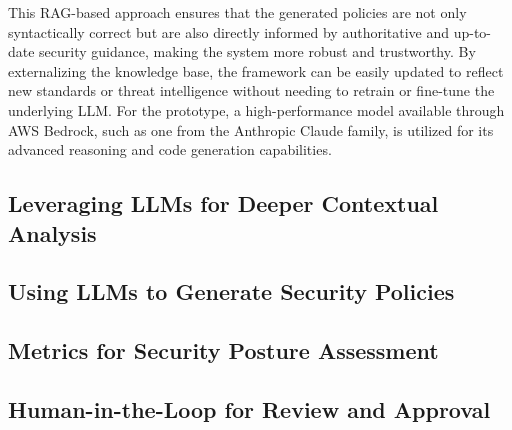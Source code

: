This RAG-based approach ensures that the generated policies are not only syntactically correct but are also directly informed by authoritative and up-to-date security guidance, making the system more robust and trustworthy. By externalizing the knowledge base, the framework can be easily updated to reflect new standards or threat intelligence without needing to retrain or fine-tune the underlying LLM. For the prototype, a high-performance model available through AWS Bedrock, such as one from the Anthropic Claude family, is utilized for its advanced reasoning and code generation capabilities.

\subsection{Leveraging LLMs for Deeper Contextual Analysis} %
\label{sec:Leveraging LLMs for Deeper Contextual Analysis}



\subsection{Using LLMs to Generate Security Policies} %
\label{sec:Using LLMs to Generate Security Policies}



\subsection{Metrics for Security Posture Assessment} %
\label{sec:Metrics for Security Posture Assessment}


\subsection{Human-in-the-Loop for Review and Approval} %
\label{sub:Human-in-the-Loop for Review and Approval}

